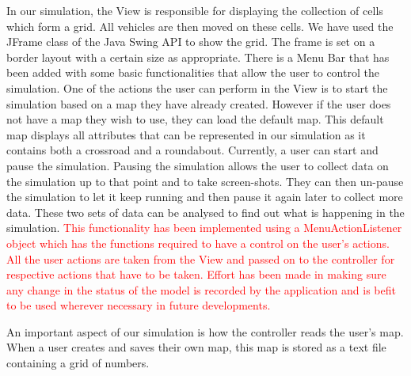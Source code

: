 \documentclass{article}
\begin{document}
In our simulation, the View is responsible for displaying the collection of cells which form a grid. All vehicles are then moved on these cells.  We have used the JFrame class of the Java Swing API to show the grid. The frame is set on a border layout with a certain size as appropriate. There is a Menu Bar that has been added with some basic functionalities that allow the user to control the simulation. One of the actions the user can perform in the View is to start the simulation based on a map they have already created. However if the user does not have a map they wish to use, they can load the default map. This default map displays all attributes that can be represented in our simulation as it contains both a crossroad and a roundabout. Currently, a user can start and pause the simulation. Pausing the simulation allows the user to collect data on the simulation up to that point and to take screen-shots. They can then un-pause the simulation to let it keep running and then pause it again later to collect more data. These two sets of data can be analysed to find out what is happening in the simulation. \textcolor{red}{This functionality has been implemented using a MenuActionListener object which has the functions required to have a control on the user's actions. All the user actions are taken from the View and passed on to the controller for respective actions that have to be taken. Effort has been made in making sure any change in the status of the model is recorded by the application and is befit to be used wherever necessary in future developments.}

An important aspect of our simulation is how the controller reads the user's map. When a user creates and saves their own map, this map is stored as a text file containing a grid of numbers. \\

\end{document}
